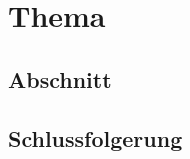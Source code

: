 %
%
%
\chapter{Thema\label{chapter:thema}}
\begin{refsection}

\section{Abschnitt}

\section{Schlussfolgerung}

\printbibliography[heading=subbibliography]
\end{refsection}
